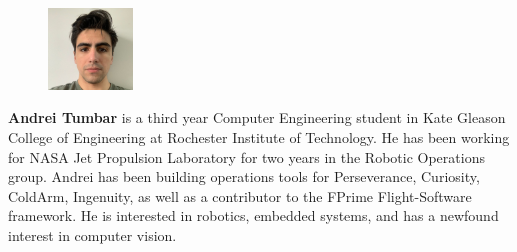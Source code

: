 \documentclass{article}
\begin{document}
\setlength{\columnsep}{8pt}
\setlength{\intextsep}{0pt}
\begin{figure}
	\centering
	\includegraphics[width=0.20\textwidth]{author}
\end{figure}
\noindent
\textbf{Andrei Tumbar} is a third year Computer Engineering student in Kate Gleason College of Engineering at Rochester Institute of Technology. He has been working for NASA Jet Propulsion Laboratory for two years in the Robotic Operations group. Andrei has been building operations tools for Perseverance, Curiosity, ColdArm, Ingenuity, as well as a contributor to the FPrime Flight-Software framework. He is interested in robotics, embedded systems, and has a newfound interest in computer vision.

\end{document}
